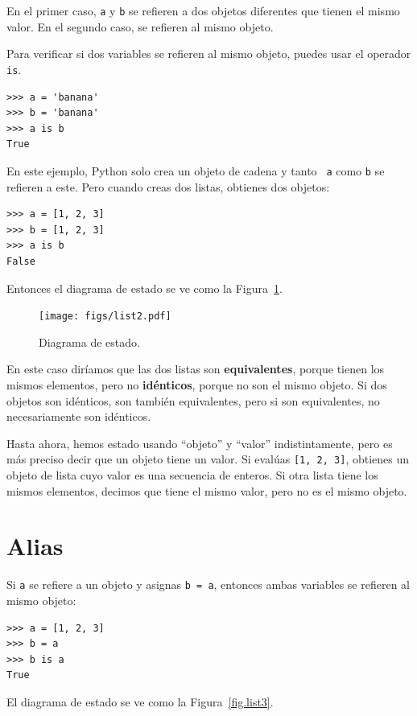\documentclass[10pt]{book}
\begin{document}
En el primer caso, {\tt a} y {\tt b} se refieren a dos objetos diferentes que
tienen el mismo valor.  En el segundo caso, se refieren al mismo
objeto.

Para verificar si dos variables se refieren al mismo objeto, puedes
usar el operador {\tt is}.

\begin{verbatim}
>>> a = 'banana'
>>> b = 'banana'
>>> a is b
True
\end{verbatim}
%
En este ejemplo, Python solo crea un objeto de cadena y tanto {\tt
  a} como {\tt b} se refieren a este.  Pero cuando creas dos listas, obtienes
dos objetos:

\begin{verbatim}
>>> a = [1, 2, 3]
>>> b = [1, 2, 3]
>>> a is b
False
\end{verbatim}
%
Entonces el diagrama de estado se ve como la Figura~\ref{fig.list2}.

\begin{figure}
\centerline
{\texttt{[image: figs/list2.pdf]}}
\caption{Diagrama de estado.}
\label{fig.list2}
\end{figure}

En este caso diríamos que las dos listas son {\bf equivalentes},
porque tienen los mismos elementos, pero no {\bf idénticos}, porque
no son el mismo objeto.  Si dos objetos son idénticos, son
también equivalentes, pero si son equivalentes, no necesariamente son
idénticos.

Hasta ahora, hemos estado usando ``objeto'' y ``valor''
indistintamente, pero es más preciso decir que un objeto tiene un
valor.  Si evalúas {\tt [1, 2, 3]}, obtienes un objeto de
lista cuyo valor es una secuencia de enteros.  Si otra
lista tiene los mismos elementos, decimos que tiene el mismo valor, pero
no es el mismo objeto.


\section{Alias}

Si {\tt a} se refiere a un objeto y asignas {\tt b = a},
entonces ambas variables se refieren al mismo objeto:

\begin{verbatim}
>>> a = [1, 2, 3]
>>> b = a
>>> b is a
True
\end{verbatim}
%
El diagrama de estado se ve como la Figura~\ref{fig.list3}.
\end{document}
